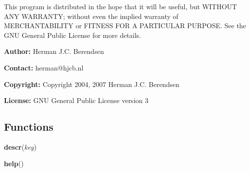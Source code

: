 This program is distributed in the hope that it will be useful, but WITHOUT
ANY WARRANTY; without even the implied warranty of MERCHANTABILITY or 
FITNESS FOR A PARTICULAR PURPOSE.  See the GNU General Public License for 
more details.

\textbf{Author:} Herman J.C. Berendsen



\textbf{Contact:} herman@hjcb.nl



\textbf{Copyright:} Copyright 2004, 2007 Herman J.C. Berendsen



\textbf{License:} GNU General Public License version 3





  \subsection{Functions}

    \label{satstress:physcon:descr}

    \vspace{0.5ex}

\hspace{.8\funcindent}\begin{boxedminipage}{\funcwidth}

    \raggedright \textbf{descr}(\textit{key})

\setlength{\parskip}{2ex}
\setlength{\parskip}{1ex}
    \end{boxedminipage}

    \label{satstress:physcon:help}

    \vspace{0.5ex}

\hspace{.8\funcindent}\begin{boxedminipage}{\funcwidth}

    \raggedright \textbf{help}()

\setlength{\parskip}{2ex}
\setlength{\parskip}{1ex}
    \end{boxedminipage}

